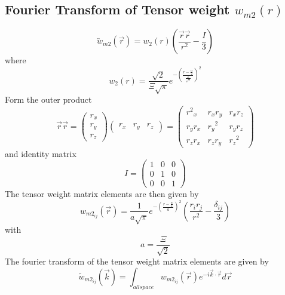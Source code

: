\documentclass[letterpaper,twocolumn,amsmath,amssymb,prb]{revtex4-1}
\begin{document}
\begin{widetext}
\subsection{Fourier Transform of Tensor weight ${w}_{m2}(r)$} %
\begin{equation}{\overleftrightarrow{w}_{m2}(\vec{r})=w_2(r)\left(\frac{\vec{r}\vec{r}}{r^2}-\frac{I}{3}\right)}\end{equation}
where
\begin{equation}{w_2(r)=\frac{\sqrt{2}}{\Xi\sqrt{\pi}}e^{-\left(\frac{r-\frac{\alpha}{2}}{\frac{\Xi}{\sqrt{2}}}\right)^2}}\end{equation}
Form the outer product
\begin{equation}{\vec{r}\vec{r}=\left(\begin{array}{c} r_x \\ r_y \\ r_z \end{array} \right) \left(\begin{array}{rrr} r_x & r_y & r_z \end{array} \right)=\left(\begin{array}{ccc} {r^2}_x & r_xr_y & r_xr_z \\ r_yr_x & {r_y}^2 & r_yr_z \\ r_zr_x & r_zr_y & {r_z}^2 \end{array}\right)}\end{equation}
and identity matrix
\begin{equation}{I=\left(\begin{array}{ccc} 1 & 0 & 0 \\ 0 & 1 & 0 \\ 0 & 0 & 1 \end{array}\right)}\end{equation}
The tensor weight matrix elements are then given by
\begin{equation}{w_{m2_{ij}}(\vec{r})=\frac{1}{a\sqrt{\pi}}e^{-\left(\frac{r-\frac{\alpha}{2}}{a}\right)^2}\left(\frac{r_ir_j}{r^2}-\frac{\delta_{ij}}{3}\right)}\end{equation}
with 
\begin{equation}{a=\frac{\Xi}{\sqrt{2}}}\end{equation}
The fourier transform of the tensor weight matrix elements are given by
\begin{equation}{\widetilde{w}_{m2_{ij}}(\vec{k})=\int_{allspace}{w_{{m2}_{ij}}}(\vec{r})e^{-i\vec{k}\cdot\vec{r}}d{\vec{r}}}\end{equation}

\end{widetext}
\end{document}
